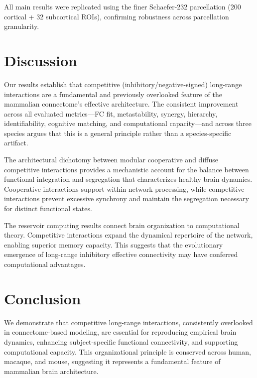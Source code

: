\documentclass[11pt]{article}
\begin{document}
All main results were replicated using the finer Schaefer-232 parcellation (200 cortical + 32 subcortical ROIs), confirming robustness across parcellation granularity.

\section{Discussion}

Our results establish that competitive (inhibitory/negative-signed) long-range interactions are a fundamental and previously overlooked feature of the mammalian connectome's effective architecture. The consistent improvement across all evaluated metrics---FC fit, metastability, synergy, hierarchy, identifiability, cognitive matching, and computational capacity---and across three species argues that this is a general principle rather than a species-specific artifact.

The architectural dichotomy between modular cooperative and diffuse competitive interactions provides a mechanistic account for the balance between functional integration and segregation that characterizes healthy brain dynamics. Cooperative interactions support within-network processing, while competitive interactions prevent excessive synchrony and maintain the segregation necessary for distinct functional states.

The reservoir computing results connect brain organization to computational theory. Competitive interactions expand the dynamical repertoire of the network, enabling superior memory capacity. This suggests that the evolutionary emergence of long-range inhibitory effective connectivity may have conferred computational advantages.

\section{Conclusion}

We demonstrate that competitive long-range interactions, consistently overlooked in connectome-based modeling, are essential for reproducing empirical brain dynamics, enhancing subject-specific functional connectivity, and supporting computational capacity. This organizational principle is conserved across human, macaque, and mouse, suggesting it represents a fundamental feature of mammalian brain architecture.



\end{document}
